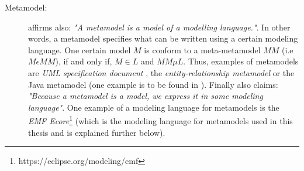 \documentclass[tuberlin,cic,tc,english,noabntcite]{iiufrgs}
\begin{document}
\begin{description}
	\item[Metamodel:] \citet[p. 14]{favre2004foundations2} affirms also: \emph{"A metamodel is a model of a modelling language."}. In other words, a metamodel specifies what can be written using a certain modeling language. One certain model $M$ is conform to a meta-metamodel $MM$ (i.e $M \epsilon MM$), if and only if, $M \in L$ and $MM \mu L$. Thus, examples of metamodels are \emph{UML specification document} \citep{omg2007unified}, the \emph{entity-relationship metamodel} \citep{chen1976entity} or the Java metamodel (one example is to be found in \citet{heidenreich2009jamopp}). Finally \citet[p. 29]{seidewitz2003models} also claims: \emph{"Because a metamodel is a model, we express it in some modeling language"}. One example of a modeling language for metamodels is the \emph{EMF Ecore}\footnote{https://eclipse.org/modeling/emf} (which is the modeling language for metamodels used in this thesis and is explained further below).
	

\end{description}
\end{document}
